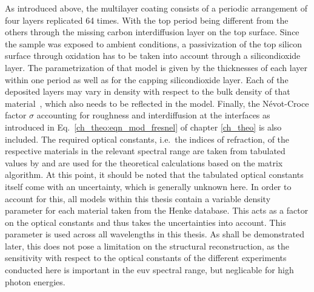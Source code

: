 As introduced above, the multilayer coating consists of a periodic arrangement of four layers replicated 64 times. With the top period being different from the others through the missing carbon interdiffusion layer on the top surface. Since the sample was exposed to ambient conditions, a passivization of the top silicon surface through oxidation has to be taken into account through a silicondioxide layer. The parametrization of that model is given by the thicknesses of each layer within one period as well as for the capping silicondioxide layer. Each of the deposited layers may vary in density with respect to the bulk density of that material~\cite{braun_mo/si_2002}, which also needs to be reflected in the model. Finally, the N{\'e}vot-Croce factor $\sigma$ accounting for roughness and interdiffusion at the interfaces as introduced in Eq.~\eqref{ch_theo:eqn_mod_fresnel} of chapter \ref{ch_theo} is also included. The required optical constants, i.e.~the indices of refraction, of the respective materials in the relevant spectral range are taken from tabulated values by \textcite{henke_x-ray_1993} and are used for the theoretical calculations based on the matrix algorithm. At this point, it should be noted that the tabulated optical constants itself come with an uncertainty, which is generally unknown here. In order to account for this, all models within this thesis contain a variable density parameter for each material taken from the Henke database. This acts as a factor on the optical constants and thus takes the uncertainties into account. This parameter is used across all wavelengths in this thesis. As shall be demonstrated later, this does not pose a limitation on the structural reconstruction, as the sensitivity with respect to the optical constants of the different experiments conducted here is important in the \gls{euv} spectral range, but neglicable for high photon energies.


